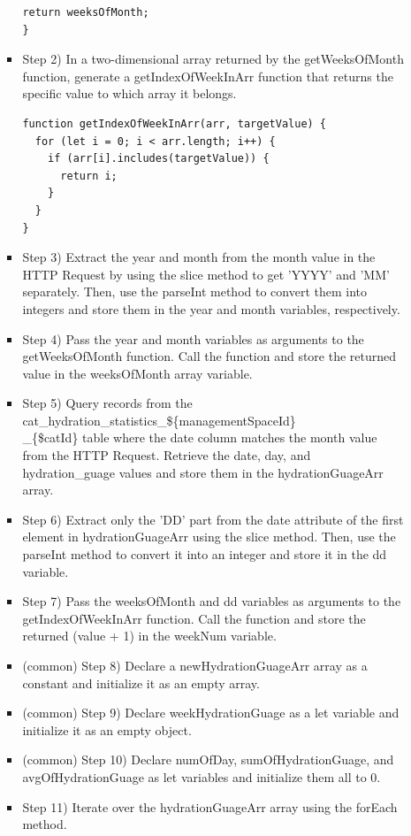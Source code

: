 \documentclass[conference]{IEEEtran}
\begin{document}
\begin{itemize}
\begin{itemize}
\begin{itemize}
\begin{lstlisting}[style=htmlcssjs]
  return weeksOfMonth;
}
            \end{lstlisting}
            \item Step 2) In a two-dimensional array returned by the getWeeksOfMonth function, generate a getIndexOfWeekInArr function that returns the specific value to which array it belongs.
            \begin{lstlisting}[style=htmlcssjs]
function getIndexOfWeekInArr(arr, targetValue) {
  for (let i = 0; i < arr.length; i++) {
    if (arr[i].includes(targetValue)) {
      return i;
    }
  }
}
            \end{lstlisting}
            \item Step 3) Extract the year and month from the month value in the HTTP Request by using the slice method to get 'YYYY' and 'MM' separately. Then, use the parseInt method to convert them into integers and store them in the year and month variables, respectively.
            \item Step 4) Pass the year and month variables as arguments to the getWeeksOfMonth function. Call the function and store the returned value in the weeksOfMonth array variable.
            \item Step 5) Query records from the cat\_hydration\_statistics\_\$\{managementSpaceId\}\\\_\{\$catId\} table where the date column matches the month value from the HTTP Request. Retrieve the date, day, and hydration\_guage values and store them in the hydrationGuageArr array.
            \item Step 6) Extract only the 'DD' part from the date attribute of the first element in hydrationGuageArr using the slice method. Then, use the parseInt method to convert it into an integer and store it in the dd variable.
            \item Step 7) Pass the weeksOfMonth and dd variables as arguments to the getIndexOfWeekInArr function. Call the function and store the returned (value + 1) in the weekNum variable.
            \item (common) Step 8) Declare a newHydrationGuageArr array as a constant and initialize it as an empty array.
            \item (common) Step 9) Declare weekHydrationGuage as a let variable and initialize it as an empty object.
            \item (common) Step 10) Declare numOfDay, sumOfHydrationGuage, and avgOfHydrationGuage as let variables and initialize them all to 0.
            \item Step 11) Iterate over the hydrationGuageArr array using the forEach method.

\end{itemize}
\end{itemize}
\end{itemize}
\end{document}
